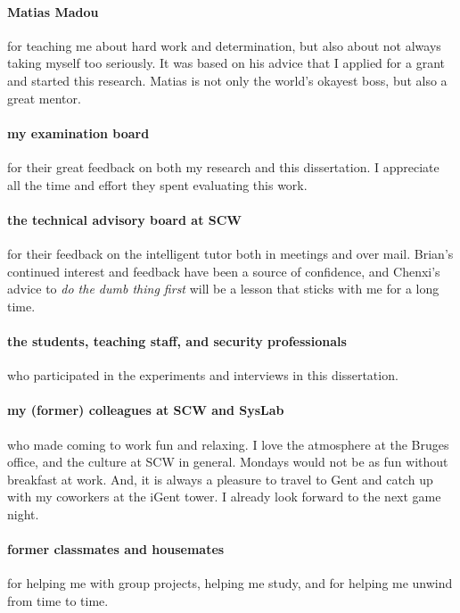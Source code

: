 \paragraph{Matias Madou}
for teaching me about hard work and determination, but also about not always taking myself too seriously.
It was based on his advice that I applied for a grant and started this research.
Matias is not only the world's okayest boss, but also a great mentor.

\paragraph{my examination board}
for their great feedback on both my research and this dissertation.
I appreciate all the time and effort they spent evaluating this work.

\paragraph{the technical advisory board at SCW}
for their feedback on the intelligent tutor both in meetings and over mail.
Brian's continued interest and feedback have been a source of confidence, and Chenxi's advice to \textit{do the dumb thing first} will be a lesson that sticks with me for a long time.

\paragraph{the students, teaching staff, and security professionals}
who participated in the experiments and interviews in this dissertation.

\paragraph{my (former) colleagues at SCW and SysLab}
who made coming to work fun and relaxing.
I love the atmosphere at the Bruges office, and the culture at SCW in general.
Mondays would not be as fun without breakfast at work.
And, it is always a pleasure to travel to Gent and catch up with my coworkers at the iGent tower.
I already look forward to the next game night.

\paragraph{former classmates and housemates}
for helping me with group projects, helping me study, and for helping me unwind from time to time.

